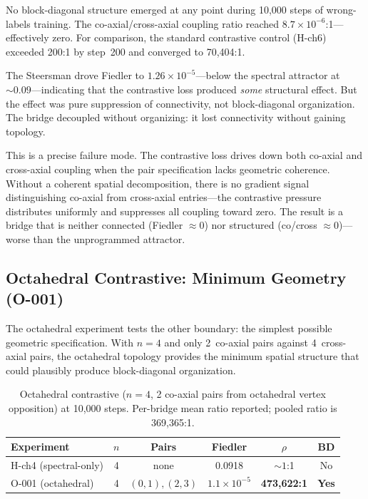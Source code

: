 No block-diagonal structure emerged at any point during 10{,}000
steps of wrong-labels training. The co-axial/cross-axial coupling
ratio reached $8.7 \times 10^{-6}$:1---effectively zero. For
comparison, the standard contrastive control (H-ch6) exceeded 200:1
by step~200 and converged to 70{,}404:1.

The Steersman drove Fiedler to $1.26 \times 10^{-5}$---below the
spectral attractor at ${\sim}0.09$---indicating that the contrastive
loss produced \emph{some} structural effect. But the effect was pure
suppression of connectivity, not block-diagonal organization. The
bridge decoupled without organizing: it lost connectivity without
gaining topology.

This is a precise failure mode. The contrastive loss drives down
both co-axial and cross-axial coupling when the pair specification
lacks geometric coherence. Without a coherent spatial decomposition,
there is no gradient signal distinguishing co-axial from cross-axial
entries---the contrastive pressure distributes uniformly and
suppresses all coupling toward zero. The result is a bridge that
is neither connected (Fiedler $\approx 0$) nor structured
(co/cross $\approx 0$)---worse than the unprogrammed attractor.

\subsection{Octahedral Contrastive: Minimum Geometry (O-001)}

The octahedral experiment tests the other boundary: the simplest
possible geometric specification. With $n = 4$ and only 2~co-axial
pairs against 4~cross-axial pairs, the octahedral topology provides
the minimum spatial structure that could plausibly produce
block-diagonal organization.

\begin{table}[H]
\centering
\caption{Octahedral contrastive ($n = 4$, 2 co-axial pairs from
  octahedral vertex opposition) at 10{,}000 steps. Per-bridge mean
  ratio reported; pooled ratio is 369{,}365:1.}
\label{tab:octahedral}
\small
\begin{tabular}{lccccc}
\toprule
Experiment & $n$ & Pairs & Fiedler & $\rho$ & BD \\
\midrule
H-ch4 (spectral-only) & 4 & none & 0.0918 & ${\sim}1$:1 & No \\
O-001 (octahedral) & 4 & $(0,1), (2,3)$ & $1.1 \times 10^{-5}$ & \textbf{473{,}622:1} & \textbf{Yes} \\
\bottomrule
\end{tabular}
\end{table}

